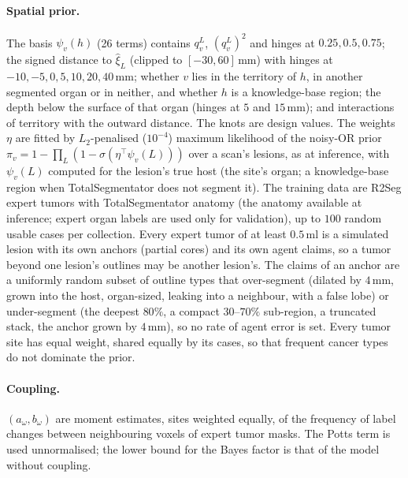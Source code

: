 \documentclass[fleqn,10pt]{olplainarticle}
\begin{document}
\paragraph{Spatial prior.} The basis $\psi_v(h)$ (26 terms) contains $q^L_v$, $(q^L_v)^2$ and hinges at $0.25,0.5,0.75$; the
signed distance to $\hat\xi_L$ (clipped to $[-30,60]$\,mm) with hinges at $-10,-5,0,5,10,20,40$\,mm; whether $v$ lies in the
territory of $h$, in another segmented organ or in neither, and whether $h$ is a knowledge-base region; the depth below the
surface of that organ (hinges at $5$ and $15$\,mm); and interactions of territory with the outward distance. The knots are
design values. The weights $\eta$ are fitted by $L_2$-penalised ($10^{-4}$) maximum likelihood of the noisy-OR prior
$\pi_v=1-\prod_L(1-\sigma(\eta^\top\psi_v(L)))$ over a scan's lesions, as at inference, with $\psi_v(L)$ computed for the
lesion's true host (the site's organ; a knowledge-base region when TotalSegmentator does not segment it). The training data are R2Seg expert
tumors with TotalSegmentator anatomy (the anatomy available at inference; expert organ labels are used only for validation),
up to $100$ random usable cases per collection. Every expert tumor of at least $0.5$\,ml is a simulated lesion with its own
anchors (partial cores) and its own agent claims, so a tumor beyond one lesion's outlines may be another lesion's. The claims
of an anchor are a uniformly random subset of outline types that over-segment (dilated by $4$\,mm, grown into the host,
organ-sized, leaking into a neighbour, with a false lobe) or under-segment (the deepest $80\%$, a compact $30$--$70\%$
sub-region, a truncated stack, the anchor grown by $4$\,mm), so no rate of agent error is set. Every tumor site has equal
weight, shared equally by its cases, so that frequent cancer types do not dominate the prior.

\paragraph{Coupling.} $(a_\omega,b_\omega)$ are moment estimates, sites weighted equally, of the frequency of label changes
between neighbouring voxels of expert tumor masks. The Potts term is used unnormalised; the lower bound for the Bayes factor is
that of the model without coupling.
\end{document}
